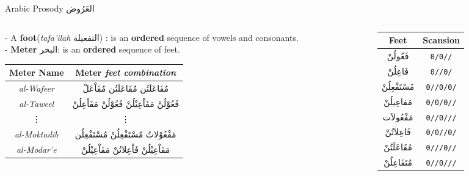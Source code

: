 \begin{frame}[fragile]{Arabic Prosody \textarabic{العَرُوض}}
\begin{columns}
	
	\begin{column}{.7\textwidth} %
		{\small 	
		- A \textbf{foot}(\textit{tafa'ilah} \textarabic{التفعيلة}) : is an \textbf{ordered} sequence of vowels and consonants. \\
		- \textbf{Meter} \textarabic{البحر}: is an \textbf{ordered} sequence of \alert{feet}. }

		\begin{table}
		\small
				\begin{tabular}[h!]{|c|c|} 
			\hline
			\textbf{Meter Name} & \textbf{Meter} \small{\textit{feet combination}} \\ 
			\hline
			\textit{\alert{al-Wafeer}}    & \textarabic{مُفَاعَلَتُن مُفَاعَلَتُن مُفَاْعَلْ} \\ %
			\textit{al-Taweel}    & \textarabic{فَعُوْلُنْ مَفَاْعِيْلُنْ فَعُوْلُنْ مَفَاْعِلُنْ} \\ %
			\vdots                &  \vdots\\
			\textit{al-Moktadib}  & \textarabic{مَفْعُوْلاتُ مُسْتَفْعِلُنْ مُسْتَفْعِلُن} \\
			\textit{al-Modar'e}   & \textarabic{مَفَاْعِيْلُنْ فَاْعِلاتُنْ مَفَاْعِيْلُنْ} \\
			\hline
		\end{tabular}
		\end{table}
	\end{column}%
		\hfill%
		\begin{column}{.3 \textwidth}
			\begin{table}
				\small
			\begin{tabular}{|c|c|} \hline
			\textbf{Feet} & \textbf{Scansion} \\
			\hline
			\textarabic{فَعُولُنْ}  & \texttt{0/0//}\\
			\textarabic{فَاعِلُنْ}  & \texttt{0//0/}\\
			\textarabic{مُسْتَفْعِلُنْ}& \texttt{0//0/0/}\\
			\textarabic{مَفاعِيلُنْ}& \texttt{0/0/0//}\\
			\textarabic{مَفْعُولاَت} & \texttt{0//0///}\\
			\textarabic{فَاعِلاَتُنْ} & \texttt{0/0//0/}\\
			\textarabic{مُفَاعَلَتُنْ}& \texttt{0///0//}\\
			\textarabic{مُتَفَاعِلُنْ}& \texttt{0//0///}\\
			\hline
		\end{tabular}
		\end{table}		


\end{column}
\end{columns}
\end{frame}
